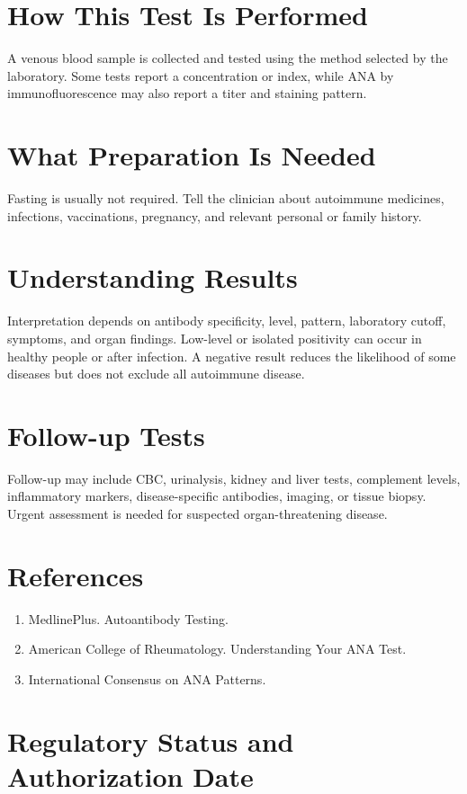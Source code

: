\section*{How This Test Is Performed}
A venous blood sample is collected and tested using the method selected by the laboratory. Some tests report a concentration or index, while ANA by immunofluorescence may also report a titer and staining pattern.

\section*{What Preparation Is Needed}
Fasting is usually not required. Tell the clinician about autoimmune medicines, infections, vaccinations, pregnancy, and relevant personal or family history.

\section*{Understanding Results}
Interpretation depends on antibody specificity, level, pattern, laboratory cutoff, symptoms, and organ findings. Low-level or isolated positivity can occur in healthy people or after infection. A negative result reduces the likelihood of some diseases but does not exclude all autoimmune disease.

\section*{Follow-up Tests}
Follow-up may include CBC, urinalysis, kidney and liver tests, complement levels, inflammatory markers, disease-specific antibodies, imaging, or tissue biopsy. Urgent assessment is needed for suspected organ-threatening disease.

\section*{References}
\begin{enumerate}
  \item MedlinePlus. Autoantibody Testing.
  \item American College of Rheumatology. Understanding Your ANA Test.
  \item International Consensus on ANA Patterns.
\end{enumerate}

\clearpage


\section*{Regulatory Status and Authorization Date}

\clearpage
